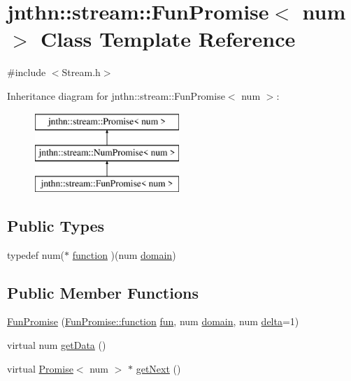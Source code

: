 \hypertarget{classjnthn_1_1stream_1_1FunPromise}{\section{jnthn\-:\-:stream\-:\-:Fun\-Promise$<$ num $>$ Class Template Reference}
\label{classjnthn_1_1stream_1_1FunPromise}
}


{\ttfamily \#include $<$Stream.\-h$>$}

Inheritance diagram for jnthn\-:\-:stream\-:\-:Fun\-Promise$<$ num $>$\-:\begin{figure}[H]
\begin{center}
\leavevmode
\includegraphics[height=3.000000cm]{classjnthn_1_1stream_1_1FunPromise}
\end{center}
\end{figure}
\subsection*{Public Types}
\begin{DoxyCompactItemize}
\item 
typedef num($\ast$ \hyperlink{classjnthn_1_1stream_1_1FunPromise_a23c79c18bfc402b4f2e6eb9de4bd3a37}{function} )(num \hyperlink{classjnthn_1_1stream_1_1NumPromise_a7d01e34ebf5e403ac4bf04139505d321}{domain})
\end{DoxyCompactItemize}
\subsection*{Public Member Functions}
\begin{DoxyCompactItemize}
\item 
\hyperlink{classjnthn_1_1stream_1_1FunPromise_af0355b7357b618a6d3cd219ef531f70d}{Fun\-Promise} (\hyperlink{classjnthn_1_1stream_1_1FunPromise_a23c79c18bfc402b4f2e6eb9de4bd3a37}{Fun\-Promise\-::function} \hyperlink{classjnthn_1_1stream_1_1NumPromise_a71f5507f8e605259eadb00417dbc2906}{fun}, num \hyperlink{classjnthn_1_1stream_1_1NumPromise_a7d01e34ebf5e403ac4bf04139505d321}{domain}, num \hyperlink{classjnthn_1_1stream_1_1FunPromise_a085f042b6a6290f177aaf73c2799b623}{delta}=1)
\item 
virtual num \hyperlink{classjnthn_1_1stream_1_1FunPromise_ab1dbc67a05202d73ac32524b92b0ef40}{get\-Data} ()
\item 
virtual \hyperlink{classjnthn_1_1stream_1_1Promise}{Promise}$<$ num $>$ $\ast$ \hyperlink{classjnthn_1_1stream_1_1FunPromise_a8c756f8b7dfc6304d82f1a514172d6fe}{get\-Next} ()
\end{DoxyCompactItemize}
